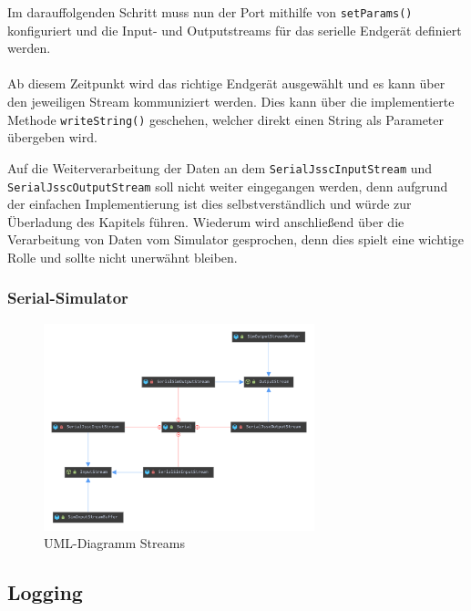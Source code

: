 Im darauffolgenden Schritt muss nun der Port mithilfe von \lstinline[style=java]{setParams()} konfiguriert und die Input- und Outputstreams für das serielle Endgerät definiert werden.\\\\

\newpage
Ab diesem Zeitpunkt wird das richtige Endgerät ausgewählt und es kann über den jeweiligen Stream kommuniziert werden.
Dies kann über die implementierte Methode \lstinline[style=java]{writeString()} geschehen, welcher direkt einen String als Parameter übergeben wird.

Auf die Weiterverarbeitung der Daten an dem \lstinline[style=java]{SerialJsscInputStream} und \lstinline[style=java]{SerialJsscOutputStream} soll nicht weiter eingegangen werden, denn aufgrund der einfachen Implementierung ist dies selbstverständlich und würde zur Überladung des Kapitels führen.
Wiederum wird anschließend über die Verarbeitung von Daten vom Simulator gesprochen, denn dies spielt eine wichtige Rolle und sollte nicht unerwähnt bleiben.
\subsubsection{Serial-Simulator}\label{sssec:serialSim}
\begin{figure}[H]
\centering
\includegraphics[width=0.7\textwidth]{fig/ainf/InputOutputStreams.pdf}
\caption{UML-Diagramm Streams}
\label{ProducerConsumer}
\end{figure}
\subsection{Logging}
